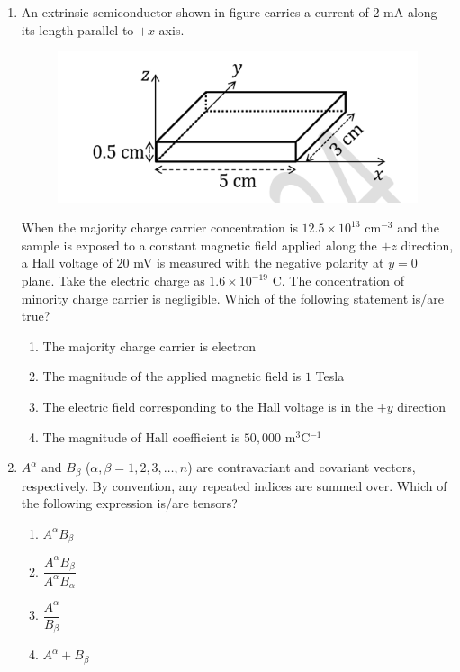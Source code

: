 \documentclass[journal,12pt,onecolumn]{IEEEtran}
\theoremstyle{remark}
\begin{document}
\begin{enumerate}
\item An extrinsic semiconductor shown in figure carries a current of 2 mA along its length parallel to $+x$ axis.
\begin{figure}[H]   
\centering   
\includegraphics[width = 0.6\columnwidth]{fig/Q50.png}     \caption*{}  
\label{fig: Q50}
\end{figure}
When the majority charge carrier concentration is $12.5 \times 10^{13}$ cm$^{-3}$ and the sample is exposed to a constant magnetic field applied along the $+z$ direction, a Hall voltage of $20$ mV is measured with the negative polarity at $y=0$ plane. Take the electric charge as $1.6 \times 10^{-19}$ C. The concentration of minority charge carrier is negligible. Which of the following statement is/are true?
\begin{enumerate}
    \item The majority charge carrier is electron
    \item The magnitude of the applied magnetic field is $1$ Tesla
    \item The electric field corresponding to the Hall voltage is in the $+y$ direction
    \item The magnitude of Hall coefficient is $50,000$ m$^3$C$^{-1}$
\end{enumerate}

\item $A^{\alpha}$ and $B_{\beta}$ ($\alpha, \beta = 1,2,3, \dots, n$) are contravariant and covariant vectors, respectively. By convention, any repeated indices are summed over. Which of the following expression is/are tensors?
\begin{enumerate}
    \item $A^{\alpha} B_{\beta}$
    \item $\dfrac{A^{\alpha} B_{\beta}}{A^{\alpha} B_{\alpha}}$
    \item $\dfrac{A^{\alpha}}{B_{\beta}}$
    \item $A^{\alpha} + B_{\beta}$
\end{enumerate}


\end{enumerate}
\end{document}
